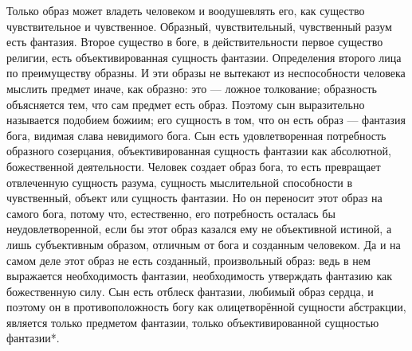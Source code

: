 \documentclass[12pt,oneside]{book}
\begin{document}
Только образ может владеть человеком и воодушевлять его, как существо чувствительное и чувственное. Образный, чувствительный, чувственный разум есть фантазия. Второе существо в боге, в действительности первое существо религии, есть объективированная сущность фантазии. Определения второго лица по преимуществу образны. И эти образы не вытекают из неспособности человека мыслить предмет иначе, как образно: это --- ложное толкование; образность объясняется тем, что сам предмет есть образ. Поэтому сын выразительно называется подобием божиим; его сущность в том, что он есть образ --- фантазия бога, видимая слава невидимого бога. Сын есть удовлетворенная потребность образного созерцания, объективированная сущность фантазии как абсолютной, божественной деятельности. Человек создает образ бога, то есть превращает отвлеченную сущность разума, сущность мыслительной способности в чувственный, объект или сущность фантазии\ddag\let\svthefootnote\thefootnote\let\thefootnote\relax{}\let\thefootnote\svthefootnote. Но он переносит этот образ на самого бога, потому что, естественно, его потребность осталась бы неудовлетворенной, если бы этот образ казался ему не объективной истиной, а лишь субъективным образом, отличным от бога и созданным человеком. Да и на самом деле этот образ не есть созданный, произвольный образ: ведь в нем выражается необходимость фантазии, необходимость утверждать фантазию как божественную силу. Сын есть отблеск фантазии, любимый образ сердца, и поэтому он в противоположность богу как олицетворённой сущности абстракции, является только предметом фантазии, только объективированной сущностью фантазии*\let\svthefootnote\thefootnote\let\thefootnote\relax{}\let\thefootnote\svthefootnote.
\end{document}
